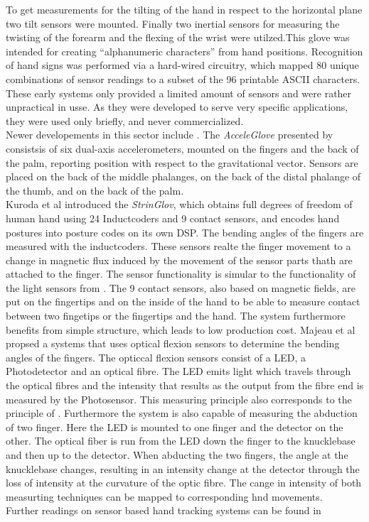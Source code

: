To get measurements  for the tilting of the hand in respect to the horizontal plane two tilt sensors were mounted. Finally two inertial sensors for measuring the twisting of the forearm and the flexing of the wrist were utilzed.This glove was intended for creating “alphanumeric characters” from hand positions. Recognition of hand signs was performed via a hard-wired circuitry, which mapped 80 unique combinations of sensor readings to a subset of the 96 printable ASCII characters.
\\These early systems only provided a limited amount of sensors and were rather unpractical in usse. As they were developed to serve very specific applications,  they were used only briefly, and never commercialized.
\\Newer developements in this sector include \cite{Kuroda.2004,HernandezRebollar.2002,Majeau.2012}. The \textit{AcceleGlove} presented by \cite{HernandezRebollar.2002} consistsis  of six dual-axis accelerometers, mounted on the fingers and the back of the palm, reporting position with respect to the gravitational vector. Sensors are placed on the back of the middle phalanges, on the back of the distal phalange of the thumb, and on the back of the palm.\\
Kuroda et al \cite{Kuroda.2004} introduced the \textit{StrinGlov}, which obtains full degrees of freedom of human hand using 24 Inductcoders and 9 contact sensors, and encodes hand postures into posture codes on its own DSP. The bending angles of the fingers are measured with the inductcoders. These sensors realte the finger movement to a change in magnetic flux induced by the movement of the sensor parts thath are attached to the finger. The sensor functionality is simular to the functionality of the light sensors from  \cite{ThomasA.DeFanti.1977}. The 9 contact sensors, also based on magnetic fields,  are put on the fingertips and on the inside of the hand to be able to measure contact between two fingetips or the fingertips and the hand. The system furthermore benefits from simple structure, which leads to low production cost. 
Majeau et al \cite{Majeau.2012} propsed a systems that uses optical flexion sensors to determine the bending angles of the fingers. The opticcal flexion sensors consist of a LED, a Photodetector and an optical fibre. The LED emits light which travels through the optical fibres and the intensity that results as the output from the fibre end is measured by the Photosensor. This measuring principle also corresponds to the principle of \cite{ThomasA.DeFanti.1977}. Furthermore the system is also capable of measuring the abduction of two finger. Here the LED is mounted to one finger and the detector on the other. The optical fiber is run from the LED down the finger to the knucklebase and then up to the detector. When abducting the two fingers, the angle at the knucklebase changes, resulting in an intensity change at the detector through the loss of intensity at the curvature of the optic fibre.
The cange in intensity of both measurting techniques can be mapped to corresponding hnd movements.
\\Further readings on sensor based hand tracking systems can be found in \cite{Dipietro.2008,Sturman.1994}

